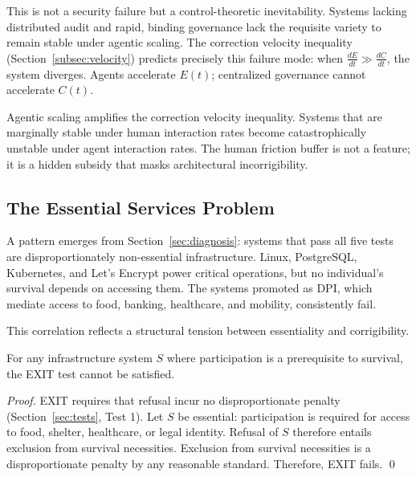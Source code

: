This is not a security failure but a control-theoretic inevitability. Systems lacking distributed audit and rapid, binding governance lack the requisite variety to remain stable under agentic scaling. The correction velocity inequality (Section~\ref{subsec:velocity}) predicts precisely this failure mode: when $\frac{dE}{dt} \gg \frac{dC}{dt}$, the system diverges. Agents accelerate $E(t)$; centralized governance cannot accelerate $C(t)$.

\begin{claim}
Agentic scaling amplifies the correction velocity inequality. Systems that are marginally stable under human interaction rates become catastrophically unstable under agent interaction rates. The human friction buffer is not a feature; it is a hidden subsidy that masks architectural incorrigibility.
\end{claim}

\subsection{The Essential Services Problem}
\label{subsec:essential}

A pattern emerges from Section~\ref{sec:diagnosis}: systems that pass all five tests are disproportionately non-essential infrastructure. Linux, PostgreSQL, Kubernetes, and Let's Encrypt power critical operations, but no individual's survival depends on accessing them. The systems promoted as DPI, which mediate access to food, banking, healthcare, and mobility, consistently fail.

This correlation reflects a structural tension between essentiality and corrigibility.

\begin{proposition}
\label{prop:essentiality}
For any infrastructure system $S$ where participation is a prerequisite to survival, the EXIT test cannot be satisfied.
\end{proposition}

\begin{proof}
EXIT requires that refusal incur no disproportionate penalty (Section~\ref{sec:tests}, Test 1). Let $S$ be essential: participation is required for access to food, shelter, healthcare, or legal identity. Refusal of $S$ therefore entails exclusion from survival necessities. Exclusion from survival necessities is a disproportionate penalty by any reasonable standard. Therefore, EXIT fails. \qed
\end{proof}

